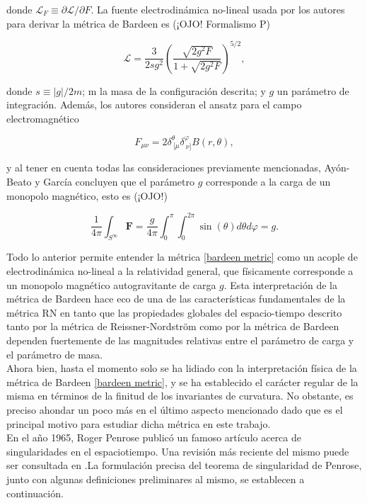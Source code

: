 \documentclass{article}
\numberwithin{equation}{section}
\theoremstyle{definition}
\begin{document}
donde $\mathcal{L}_{F} \equiv \partial \mathcal{L}/\partial F$. La fuente electrodinámica no-lineal usada por los autores para derivar la métrica de Bardeen es (¡OJO! Formalismo P)

\begin{equation}
\label{nonlinear bardeen}
\mathcal{L} = \frac{3}{2sg^2}\left( \frac{\sqrt{2g^2F}}{1 + \sqrt{2g^2F}} \right)^{5/2},
\end{equation}

donde $s \equiv |g|/2m$; m la masa de la configuración descrita; y $g$ un parámetro de integración. Además, los autores consideran el ansatz para el campo electromagnético 

\begin{equation}
F_{\mu \nu} = 2 \delta^{\theta}_{\ \lbrack\mu} \delta^{\varphi}_{\ \nu\rbrack} B(r, \theta),
\end{equation}

y al tener en cuenta todas las consideraciones previamente mencionadas, Ayón-Beato y García concluyen que el parámetro $g$ corresponde a la carga de un monopolo magnético, esto es (¡OJO!)

\begin{equation}
\frac{1}{4 \pi} \int_{S^{\infty}}\mathbf{F} = \frac{g}{4 \pi} \int_{0}^{\pi}\int_{0}^{2\pi}\sin (\theta) d\theta d\varphi = g.
\end{equation}

Todo lo anterior permite entender la métrica \eqref{bardeen metric} como un acople de electrodinámica no-lineal a la relatividad general, que físicamente corresponde a un monopolo magnético autogravitante de carga $g$. Esta interpretación de la métrica de Bardeen hace eco de una de las características fundamentales de la métrica RN en tanto que las propiedades globales del espacio-tiempo descrito tanto por la métrica de Reissner-Nordström como por la métrica de Bardeen dependen fuertemente de las magnitudes relativas entre el parámetro de carga y el parámetro de masa.\\

Ahora bien, hasta el momento solo se ha lidiado con la interpretación física de la métrica de Bardeen \eqref{bardeen metric}, y se ha establecido el carácter regular de la misma en términos de la finitud de los invariantes de curvatura. No obstante, es preciso ahondar un poco más en el último aspecto mencionado dado que es el principal motivo para estudiar dicha métrica en este trabajo.\\

En el año 1965, Roger Penrose publicó un famoso artículo \cite{penrose} acerca de singularidades en el espaciotiempo. Una revisión más reciente del mismo puede ser consultada en \cite{senovilla2015}.La formulación precisa del teorema de singularidad de Penrose, junto con algunas definiciones preliminares al mismo, se establecen a continuación. 
\end{document}
